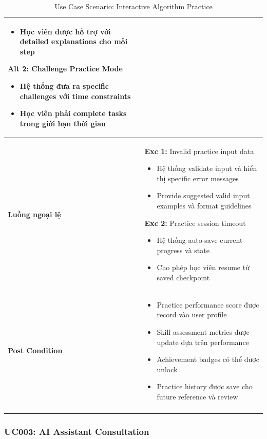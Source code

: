 \begin{longtable}{| p{3cm} | p{10cm} |}
\begin{itemize}
    \item Học viên được hỗ trợ với detailed explanations cho mỗi step
\end{itemize}
\textbf{Alt 2:} Challenge Practice Mode
\begin{itemize}
    \item Hệ thống đưa ra specific challenges với time constraints
    \item Học viên phải complete tasks trong giới hạn thời gian
\end{itemize} \\ \hline
\textbf{Luồng ngoại lệ} & 
\textbf{Exc 1:} Invalid practice input data
\begin{itemize}
    \item Hệ thống validate input và hiển thị specific error messages
    \item Provide suggested valid input examples và format guidelines
\end{itemize}
\textbf{Exc 2:} Practice session timeout
\begin{itemize}
    \item Hệ thống auto-save current progress và state
    \item Cho phép học viên resume từ saved checkpoint
\end{itemize} \\ \hline
\textbf{Post Condition} & 
\begin{itemize}
    \item Practice performance score được record vào user profile
    \item Skill assessment metrics được update dựa trên performance
    \item Achievement badges có thể được unlock
    \item Practice history được save cho future reference và review
\end{itemize} \\ \hline
\caption{Use Case Scenario: Interactive Algorithm Practice}
\label{tab:uc002} \\
\end{longtable}

\subsubsection{UC003: AI Assistant Consultation}

